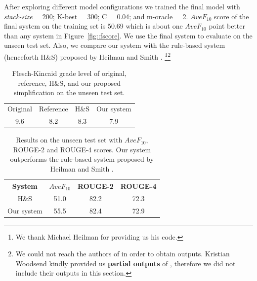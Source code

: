 \documentclass[10pt]{article}
\begin{document}
After exploring different model configurations we trained the final model with \textit{stack-size} = 200; K-best = 300; C = 0.04; and m-oracle = 2.
$AveF_{10}$ score of the final system on the training set is 50.69 which is about one $AveF_{10}$ point better than any system in Figure~\ref{fig::fscore}.
We use the final system to evaluate on the unseen test set.
Also, we compare our system with the rule-based system (henceforth H\&S) proposed by Heilman and Smith .%
\footnote{We thank Michael Heilman for providing us his code.}\footnote{We could not reach the authors of \cite{Zhu:2010} in order to obtain outputs. Kristian Woodsend kindly provided us \textbf{partial outputs} of \cite{woodsend-lapata:2011:EMNLP}, therefore we did not include their outputs in this section.}

\begin{table}[h]
\begin{center}
\begin{tabular}{cccc}\toprule
Original & Reference & H\&S & Our system\\ 
9.6 & 8.2 & 8.3 & 7.9 \\ 
\bottomrule
\end{tabular} 
\end{center}
\caption{Flesch-Kincaid grade level of original, reference, H\&S, and our proposed simplification on the unseen test set.}
\label{table::Flesch-Kincaid}
\end{table}

\begin{table}[h]
\begin{center}
\begin{tabular}{cccc}\toprule
System & $AveF_{10}$ & ROUGE-2 & ROUGE-4 \\ 
\midrule
H\&S & 51.0 & 82.2 &  72.3\\
Our system & 55.5 & 82.4 & 72.9 \\ 
\bottomrule
\end{tabular} 
\end{center}
\caption{Results on the unseen test set with $AveF_{10}$, ROUGE-2 and ROUGE-4 scores. Our system outperforms the rule-based system proposed by Heilman and Smith .}
\label{table::Others}
\end{table}
\end{document}
